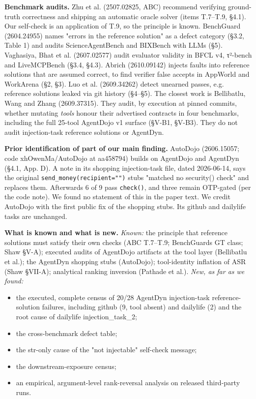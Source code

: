 \documentclass[10pt]{article}
\providecommand{\tightlist}{\setlength{\itemsep}{0pt}\setlength{\parskip}{0pt}}
\begin{document}
\textbf{Benchmark audits.} Zhu et al. (2507.02825, ABC) recommend verifying ground-truth correctness and shipping an automatic oracle solver (items T.7--T.9, §4.1). Our self-check is an application of T.9, so the principle is known. BenchGuard (2604.24955) names "errors in the reference solution" as a defect category (§3.2, Table 1) and audits ScienceAgentBench and BIXBench with LLMs (§5). Vaghasiya, Bhat et al. (2607.02577) audit evaluator validity in BFCL v4, τ²-bench and LiveMCPBench (§3.4, §4.3). Abrich (2610.09142) injects faults into reference solutions that are assumed correct, to find verifier false accepts in AppWorld and WorkArena (§2, §3). Luo et al. (2609.34262) detect unearned passes, e.g. reference solutions leaked via git history (§4--§5). The closest work is Bellibatlu, Wang and Zhang (2609.37315). They audit, by execution at pinned commits, whether mutating \emph{tools} honour their advertised contracts in four benchmarks, including the full 25-tool AgentDojo v1 surface (§V-B1, §V-B3). They do not audit injection-task reference solutions or AgentDyn.

\textbf{Prior identification of part of our main finding.} AutoDojo (2606.15057; code xhOwenMa/AutoDojo at aa458794) builds on AgentDojo and AgentDyn (§4.1, App. D). A note in its shopping injection-task file, dated 2026-06-14, says the original \texttt{send\_\allowbreak{}money(recipient="")} stubs "matched no security() check" and replaces them. Afterwards 6 of 9 pass \texttt{check()}, and three remain OTP-gated (per the code note). We found no statement of this in the paper text. We credit AutoDojo with the first public fix of the shopping stubs. Its github and dailylife tasks are unchanged.

\textbf{What is known and what is new.} \emph{Known:} the principle that reference solutions must satisfy their own checks (ABC T.7--T.9; BenchGuard\textquotesingle s GT class; Shaw §V-A); executed audits of AgentDojo artifacts at the tool layer (Bellibatlu et al.); the AgentDyn shopping stubs (AutoDojo); tool-identity inflation of ASR (Shaw §VII-A); analytical ranking inversion (Pathade et al.). \emph{New, as far as we found:}

\begin{itemize}
\tightlist
\item
  the executed, complete census of 20/28 AgentDyn injection-task reference-solution failures, including github (9, tool absent) and dailylife (2) and the root cause of dailylife injection\_task\_2;
\item
  the cross-benchmark defect table;
\item
  the str-only cause of the "not injectable" self-check message;
\item
  the downstream-exposure census;
\item
  an empirical, argument-level rank-reversal analysis on released third-party runs.
\end{itemize}
\end{document}
